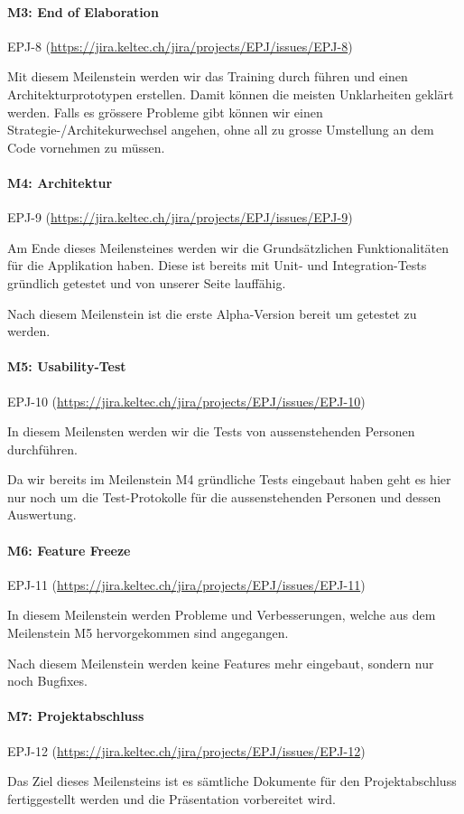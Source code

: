 \documentclass[a4paper]{article}
\def\jiraurl{https://jira.keltec.ch/jira}
\newcommand{\fulljiraissue}[1]{EPJ-#1 (\url{\jiraurl/projects/EPJ/issues/EPJ-#1})}
\begin{document}
\paragraph{M3: End of Elaboration} \fulljiraissue{8}

Mit diesem Meilenstein werden wir das Training durch führen und einen Architekturprototypen erstellen.
Damit können die meisten Unklarheiten geklärt werden.
Falls es grössere Probleme gibt können wir einen Strategie-/Architekurwechsel angehen, ohne all zu grosse Umstellung an dem Code vornehmen zu müssen.

\paragraph{M4: Architektur} \fulljiraissue{9}

Am Ende dieses Meilensteines werden wir die Grundsätzlichen Funktionalitäten für die Applikation haben.
Diese ist bereits mit Unit- und Integration-Tests gründlich getestet und von unserer Seite lauffähig.

Nach diesem Meilenstein ist die erste Alpha-Version bereit um getestet zu werden.

\paragraph{M5: Usability-Test} \fulljiraissue{10}

In diesem Meilensten werden wir die Tests von aussenstehenden Personen durchführen.

Da wir bereits im Meilenstein M4 gründliche Tests eingebaut haben geht es hier nur noch um die Test-Protokolle für die aussenstehenden Personen und dessen Auswertung.

\paragraph{M6: Feature Freeze} \fulljiraissue{11}

In diesem Meilenstein werden Probleme und Verbesserungen, welche aus dem Meilenstein M5 hervorgekommen sind angegangen.

Nach diesem Meilenstein werden keine Features mehr eingebaut, sondern nur noch Bugfixes.

\paragraph{M7: Projektabschluss} \fulljiraissue{12}

Das Ziel dieses Meilensteins ist es sämtliche Dokumente für den Projektabschluss fertiggestellt werden und die Präsentation vorbereitet wird.
\end{document}
